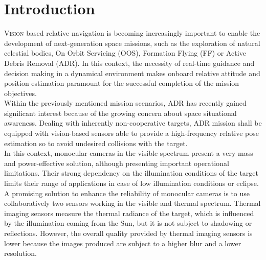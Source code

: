 

\chapter{Introduction}
\lettrine{V}{ision} based relative navigation is becoming increasingly important to enable the development of next-generation space missions, such as the exploration of natural celestial bodies, On Orbit Servicing (OOS), Formation Flying (FF) or Active Debris Removal (ADR). In this context, the necessity of real-time guidance and decision making in a dynamical environment makes onboard relative attitude and position estimation paramount for the successful completion of the mission objectives. \\
 Within the previously mentioned mission scenarios, ADR has recently gained significant interest because of the growing concern about space situational awareness. Dealing with inherently non-cooperative targets, ADR mission shall be equipped with vision-based sensors able to provide a high-frequency relative pose estimation so to avoid undesired collisions with the target.\\
In this context, monocular cameras in the visible spectrum present a very mass and power-effective solution, although presenting important operational limitations. Their strong dependency on the illumination conditions of the target limits their range of applications in case of low illumination conditions or eclipse. A promising solution to enhance the reliability of monocular cameras is to use collaboratively two sensors working in the visible and thermal spectrum. Thermal imaging sensors measure the thermal radiance of the target, which is influenced by the illumination coming from the Sun, but it is not subject to shadowing or reflections. However, the overall quality provided by thermal imaging sensors is lower because the images produced are subject to a higher blur and a lower resolution. \\
